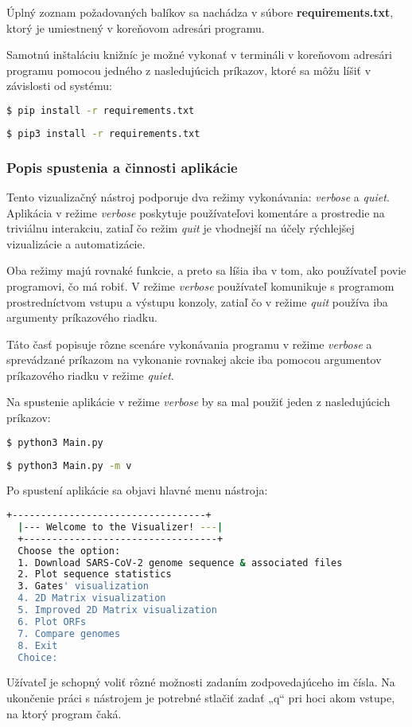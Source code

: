 Úplný zoznam požadovaných balíkov sa nachádza v súbore \textbf{\selectfont requirements.txt}, ktorý je umiestnený v koreňovom adresári programu.

Samotnú inštaláciu knižníc je možné vykonať v termináli v koreňovom adresári programu pomocou jedného z nasledujúcich príkazov, ktoré sa môžu líšiť v závislosti od systému:
\begin{lstlisting}[language=bash]
  $ pip install -r requirements.txt
\end{lstlisting}
\begin{lstlisting}[language=bash]
  $ pip3 install -r requirements.txt
\end{lstlisting}

\subsubsection{\Large{Popis spustenia a  činnosti aplikácie}}
Tento vizualizačný nástroj podporuje dva režimy vykonávania: \textit {verbose} a \textit {quiet}.
Aplikácia v režime \textit{verbose} poskytuje používateľovi komentáre a prostredie na triviálnu interakciu, zatiaľ čo režim \textit{quit} je vhodnejší na účely rýchlejšej vizualizácie a automatizácie.

Oba režimy majú rovnaké funkcie, a preto sa líšia iba v tom, ako používateľ povie programovi, čo má robiť.
V režime \textit{verbose} používateľ komunikuje s programom prostredníctvom vstupu a výstupu konzoly, zatiaľ čo v režime \textit{quit} používa iba argumenty príkazového riadku.

Táto časť popisuje rôzne scenáre vykonávania programu v režime \textit{verbose} a sprevádzané príkazom na vykonanie rovnakej akcie iba pomocou argumentov príkazového riadku v režime \textit{quiet}.

Na spustenie aplikácie v režime \textit{verbose} by sa mal použiť jeden z nasledujúcich príkazov:
\begin{lstlisting}[language=bash]
  $ python3 Main.py
\end{lstlisting}
\begin{lstlisting}[language=bash]
  $ python3 Main.py -m v
\end{lstlisting}

Po spustení aplikácie sa objavi hlavné menu nástroja:
\begin{lstlisting}[language=bash]
  +----------------------------------+
  |--- Welcome to the Visualizer! ---|
  +----------------------------------+
  Choose the option: 
  1. Download SARS-CoV-2 genome sequence & associated files
  2. Plot sequence statistics
  3. Gates' visualization
  4. 2D Matrix visualization
  5. Improved 2D Matrix visualization
  6. Plot ORFs
  7. Compare genomes
  8. Exit
  Choice: 
\end{lstlisting}
Užívateľ je schopný voliť rôzné možnosti zadaním zodpovedajúceho im čísla.
Na ukončenie práci s nástrojem je potrebné stlačiť zadať „q“ pri hoci akom vstupe, na ktorý program čaká.


